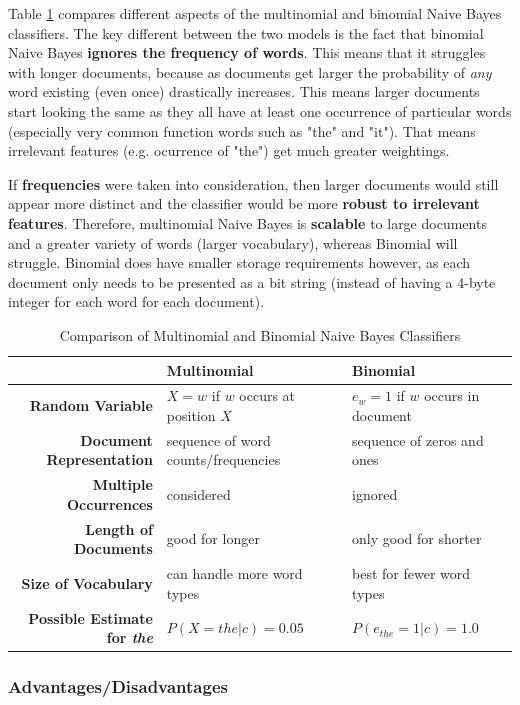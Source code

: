 \documentclass{article}
\begin{document}
Table \ref{tab:mult-bi-comparison} compares different aspects of the multinomial and binomial Naive Bayes classifiers. The key different between the two models is the fact that binomial Naive Bayes \textbf{ignores the frequency of words}. This means that it struggles with longer documents, because as documents get larger the probability of \textit{any} word existing (even once) drastically increases. This means larger documents start looking the same as they all have at least one occurrence of particular words (especially very common function words such as "the" and "it"). That means irrelevant features (e.g. ocurrence of "the") get much greater weightings.

If \textbf{frequencies} were taken into consideration, then larger documents would still appear more distinct and the classifier would be more  \textbf{robust to irrelevant features}. Therefore, multinomial Naive Bayes is \textbf{scalable} to large documents and a greater variety of words (larger vocabulary), whereas Binomial will struggle. Binomial does have smaller storage requirements however, as each document only needs to be presented as a bit string (instead of having a 4-byte integer for each word for each document).

\begin{table}
	\centering
	\begin{tabular}{|r|l|l|}
		\hline
		& \textbf{Multinomial} & \textbf{Binomial} \\
		\hline
		\textbf{Random Variable} & $X = w$ if $w$ occurs at position $X$ & $e_w = 1$ if $w$ occurs in document \\
		\textbf{Document Representation} & sequence of word counts/frequencies & sequence of zeros and ones \\
		\textbf{Multiple Occurrences} & considered & ignored \\
		\textbf{Length of Documents} & good for longer & only good for shorter \\
		\textbf{Size of Vocabulary} & can handle more word types & best for fewer word types \\
		\textbf{Possible Estimate for \textit{the}} & $P(X = the|c) = 0.05$ & $P(e_{the} = 1|c) = 1.0$ \\
		\hline
	\end{tabular}
	\caption{Comparison of Multinomial and Binomial Naive Bayes Classifiers}
	\label{tab:mult-bi-comparison}
\end{table}

\subsubsection{Advantages/Disadvantages}
\end{document}
